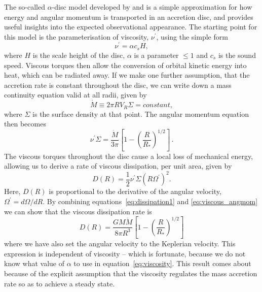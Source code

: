 \label{sec:alpha_disc}

The so-called $\alpha$-disc model developed by 
\citet[][hereafter SS73]{shakurasunyaev1973} and \cite{lyndenbell1969} is
a simple approximation for how energy and angular momentum
is transported in an accretion disc, and provides useful insights into
the expected observational appearance. 
The starting point for this model is the parameterisation
of viscosity, $\nu^\prime$, using the simple form
\begin{equation}
\nu^\prime = \alpha c_s H,
\label{eq:viscosity}
\end{equation}
where $H$ is the scale height of the disc,
$\alpha$ is a parameter $\leq 1$ and $c_s$ is the sound speed.
Viscous torques then allow the conversion of orbital kinetic energy into heat, 
which can be radiated away. 
If we make one further assumption, that the accretion rate is
constant throughout the disc, we can write down a mass continuity equation
valid at all radii, given by
\begin{equation}
\dot{M} \equiv 2 \pi R V_R \Sigma = constant,
\end{equation}
where $\Sigma$ is the surface density at that point. 
The angular momentum equation then becomes
\begin{equation}
\nu^\prime \Sigma = \frac{\dot{M}}{3 \pi} \left[1 - \left( \frac{R}{R_*} \right)^{1/2} \right]\, .
\label{eq:viscous_angmom}
\end{equation}
The viscous torques throughout the disc cause a local loss of mechanical energy, allowing 
us to derive \citep[see, e.g.][]{fkrbook} a rate of viscous dissipation, 
per unit area, given by
\begin{equation}
D(R) = \frac{1}{2} \nu^\prime \Sigma (R \Omega^\prime)^2.
\label{eq:dissipation1}
\end{equation}
Here, $D(R)$ is proportional to the derivative of the angular velocity, $\Omega^\prime=d\Omega/dR$.
By combining equations~\ref{eq:dissipation1} and \ref{eq:viscous_angmom} we can show that the 
viscous dissipation rate is 
\begin{equation}
D(R) = \frac{G M \dot{M}}{8 \pi R^3} \left[1 - \left( \frac{R}{R_*} \right)^{1/2} \right]
\label{eq:dissipation2}
\end{equation}
where we have also set the angular velocity to the Keplerian velocity. 
This expression is independent of viscosity -- which is fortunate, because
we do not know what value of $\alpha$ to use in equation~\ref{eq:viscosity}.
This result comes about because of the explicit assumption that the viscosity regulates
the mass accretion rate so as to achieve a steady state.

